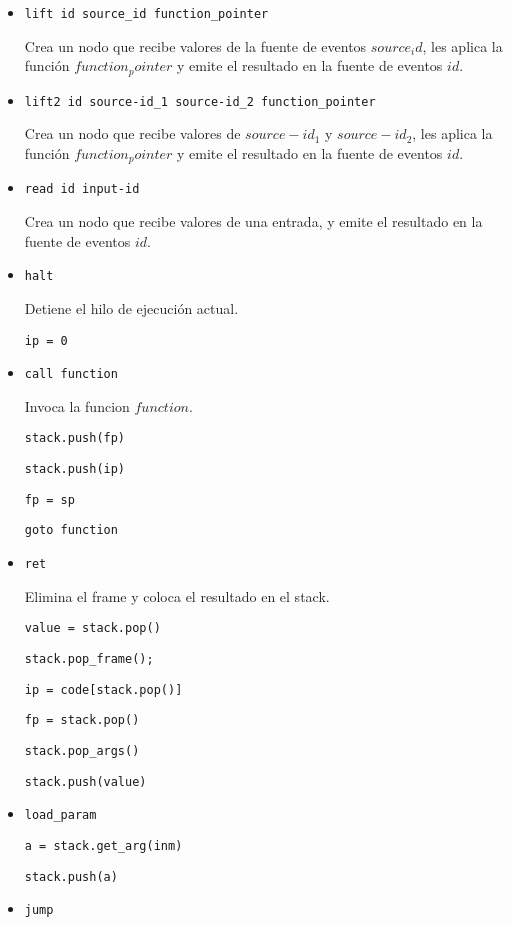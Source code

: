 \begin{itemize}
\item \texttt{lift id source\_id function\_pointer}

 Crea un nodo que recibe valores de la fuente de
 eventos $source_id$,
 les aplica la función $function_pointer$ y emite el resultado
 en la fuente de eventos $id$.

\item \texttt{lift2 id source-id\_1 source-id\_2 function\_pointer}

 Crea un nodo que recibe valores de $source-id_1$ y
 $source-id_2$,
 les aplica la función $function_pointer$ y emite el resultado
 en la fuente de eventos $id$.

\item \texttt{read id input-id}

 Crea un nodo que recibe valores de una entrada,
 y emite el resultado en la fuente de eventos $id$.

\item \texttt{halt}

  Detiene el hilo de ejecución actual.

  \texttt{ip = 0} 

\item \texttt{call function}

  Invoca la funcion $function$.

  \texttt{stack.push(fp)}

  \texttt{stack.push(ip)}

  \texttt{fp = sp}

  \texttt{goto function}

\item \texttt{ret}

  Elimina el frame y coloca el resultado en el stack.

  \texttt{value = stack.pop()}

  \texttt{stack.pop\_frame();}

  \texttt{ip = code[stack.pop()]}

  \texttt{fp = stack.pop()}

  \texttt{stack.pop\_args()}

  \texttt{stack.push(value)}

\item \texttt{load\_param}

  \texttt{a = stack.get\_arg(inm)}

  \texttt{stack.push(a)}

\item \texttt{jump}


\end{itemize}
